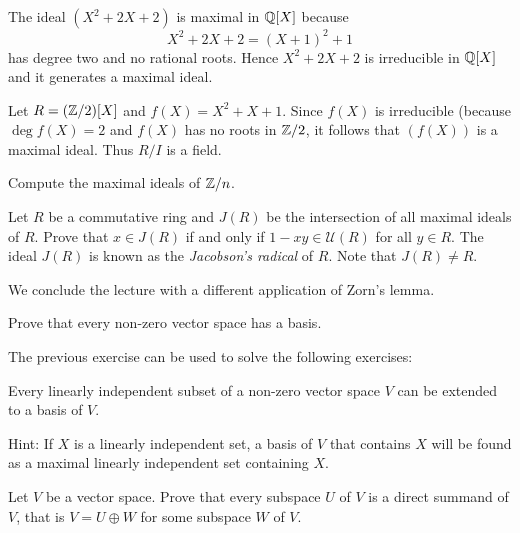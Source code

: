 \begin{example}
	The ideal $(X^2+2X+2)$ is maximal in $\mathbb{Q}[X]$ because
	\[
	X^2+2X+2=(X+1)^2+1
	\]
	has degree two and no rational roots. 
	Hence $X^2+2X+2$ is irreducible in $\mathbb{Q}[X]$ and it generates 
	a maximal ideal. 	
\end{example}


\begin{example}
	Let $R=(\mathbb{Z}/2)[X]$ and $f(X)=X^2+X+1$. Since $f(X)$ is irreducible (because $\deg f(X)=2$ and
	$f(X)$ has no roots in $\mathbb{Z}/2$, it follows that $(f(X))$ is a maximal ideal. 
	Thus $R/I$ is a field. 
\end{example}

\begin{exercise}
	Compute the maximal ideals of $\mathbb{Z}/n$. 	
\end{exercise}

\begin{exercise}
\label{xca:Jacobson}
	Let $R$ be a commutative ring and $J(R)$ be the intersection of all maximal ideals 
	of $R$. Prove that $x\in J(R)$ 
	if and only if $1-xy\in\mathcal{U}(R)$ for all $y\in R$. The ideal $J(R)$ is known
	as the \emph{Jacobson's radical} of $R$. Note that $J(R)\ne R$.   
\end{exercise}

We conclude the lecture with a different application of Zorn's lemma.  

\begin{bonus}
	Prove that every non-zero vector space has a basis.
\end{bonus}

The previous exercise can be used to solve the following exercises:

\begin{bonus}
\label{xca:extend}
    Every linearly independent subset of a non-zero vector space
    $V$ can be extended to a basis of $V$.
\end{bonus} 

Hint: If $X$ is a linearly independent set, a basis 
of $V$ that contains $X$ will be found as a maximal linearly independent set 
containing $X$. 

\begin{bonus}
    Let $V$ be a vector space. Prove that every subspace $U$ of $V$ is a direct summand of $V$, that is
    $V=U\oplus W$ for some subspace $W$ of $V$. 
\end{bonus}

